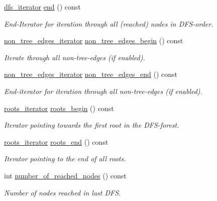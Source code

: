 \begin{DoxyCompactItemize}
\mbox{\hyperlink{classdfs_a15fe023a5a1f7ddda00f3d87110d9a32}{dfs\+\_\+iterator}} \mbox{\hyperlink{classdfs_af847633fa642258d3522e8deb26aef37}{end}} () const
\begin{DoxyCompactList}\small\item\em End-\/\+Iterator for iteration through all (reached) nodes in D\+F\+S-\/order. \end{DoxyCompactList}\item 
\mbox{\hyperlink{classdfs_a95e353f354d3b31daded0c4fe749171a}{non\+\_\+tree\+\_\+edges\+\_\+iterator}} \mbox{\hyperlink{classdfs_a4efe5bb72d00305e6b226e67c2b2ef6e}{non\+\_\+tree\+\_\+edges\+\_\+begin}} () const
\begin{DoxyCompactList}\small\item\em Iterate through all non-\/tree-\/edges (if enabled). \end{DoxyCompactList}\item 
\mbox{\hyperlink{classdfs_a95e353f354d3b31daded0c4fe749171a}{non\+\_\+tree\+\_\+edges\+\_\+iterator}} \mbox{\hyperlink{classdfs_ad9cd92a18bda23edca8ab3ac60a15ef4}{non\+\_\+tree\+\_\+edges\+\_\+end}} () const
\begin{DoxyCompactList}\small\item\em End-\/iterator for iteration through all non-\/tree-\/edges (if enabled). \end{DoxyCompactList}\item 
\mbox{\hyperlink{classdfs_a1ea6e8eb2766ac95ac48a8523359065a}{roots\+\_\+iterator}} \mbox{\hyperlink{classdfs_af56fa2b736f0b924dba1257e18ba4b61}{roots\+\_\+begin}} () const
\begin{DoxyCompactList}\small\item\em Iterator pointing towards the first root in the D\+F\+S-\/forest. \end{DoxyCompactList}\item 
\mbox{\hyperlink{classdfs_a1ea6e8eb2766ac95ac48a8523359065a}{roots\+\_\+iterator}} \mbox{\hyperlink{classdfs_ae1a61d8c2d8d99059cab410f766ec73f}{roots\+\_\+end}} () const
\begin{DoxyCompactList}\small\item\em Iterator pointing to the end of all roots. \end{DoxyCompactList}\item 
int \mbox{\hyperlink{classdfs_ae8849a552721ad4af5d9a81c6da35822}{number\+\_\+of\+\_\+reached\+\_\+nodes}} () const
\begin{DoxyCompactList}\small\item\em Number of nodes reached in last D\+FS. \end{DoxyCompactList}\item 

\end{DoxyCompactItemize}
